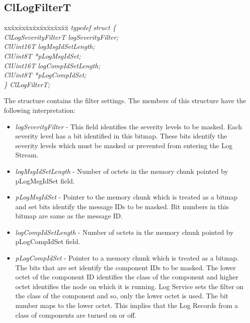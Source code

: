 \begin{flushleft}
\begin{itemize}
\subsection{ClLogFilterT}
\begin{tabbing}
xx\=xx\=xx\=xx\=xx\=xx\=xx\=xx\=xx\=\kill
\textit{typedef struct \{}\\
\>\>\>\>\textit{ClLogSeverityFilterT	logSeverityFilter;}\\
\>\>\>\>\textit{ClUint16T			logMsgIdSetLength;}\\
\>\>\>\>\textit{ClUint8T			*pLogMsgIdSet;}\\
\>\>\>\>\textit{ClUint16T			logCompIdSetLength;}\\
\>\>\>\>\textit{ClUint8T			*pLogCompIdSet;}\\
\textit{\} ClLogFilterT;}\end{tabbing}
The structure contains the filter settings. The members of this structure have the following interpretation:
\begin{itemize}
\item
\textit{logSeverityFilter} - This field identifies the severity levels to be masked. Each severity level has a bit identified in this
bitmap. These bits identify the severity levels which must be masked or prevented from entering the Log Stream.
\item
\textit{logMsgIdSetLength} - Number of octets in the memory chunk pointed by pLogMsgIdSet field.
\item
\textit{pLogMsgIdSet} - Pointer to the memory chunk which is treated as a bitmap and set bits identify the message IDs to be masked. Bit numbers
in this bitmap are same as the message ID.
\item
\textit{logCompIdSetLength} - Number of octets in the memory chunk pointed by pLogCompIdSet field.
\item
\textit{pLogCompIdSet} - Pointer to a memory chunk which is treated as a bitmap. The bits that are set identify the component IDs to be masked. 
The lower octet of the component ID identifies the class of the component and higher octet identifies the node on which 
it is running. Log Service sets the filter on the class of the component and so, only the lower octet is used. The bit number maps to the lower
octet. This implies that the Log Records from a class of components are turned on or off.
\end{itemize}	



















\end{itemize}
\end{flushleft}
